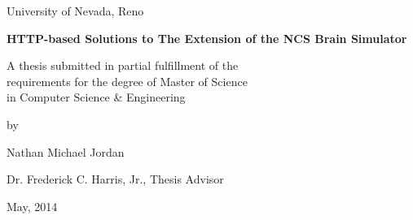\setcounter{page}{0}
\thispagestyle{empty}

\begin{center}
University of Nevada, Reno

\vfill


{\Large \bf HTTP-based Solutions to The Extension of the NCS Brain Simulator\\ \vspace{0.05in}}
\vfill

A thesis submitted in partial fulfillment of the\\
requirements for the degree of Master of Science\\
in Computer Science \& Engineering

\vfill

by

\vspace{0.5in}

Nathan Michael Jordan

\vspace{0.5in}

Dr. Frederick C. Harris, Jr., Thesis Advisor

\vspace{0.5in}

May, 2014
\end{center}
